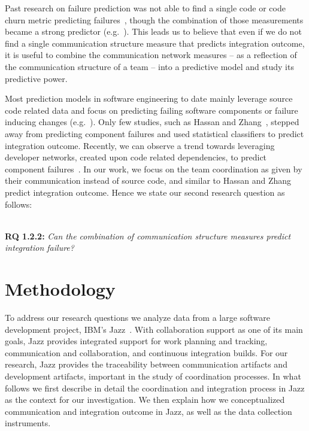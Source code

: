 Past research on failure prediction was not able to find a single code or code
churn metric predicting
failures~\cite{nagappan:icse:2006,basili:1996tse,denaro:2002seke}, though the
combination of those measurements became a strong predictor
(e.g.~\cite{mockus:2000bell}). This leads us to believe that even if we do not
find a single communication structure measure that predicts integration outcome,
it is useful to combine the communication network measures -- as a reflection of
the communication structure of a team -- into a predictive model and study its
predictive power.

Most prediction models in software engineering to date mainly leverage source
code related data and focus on predicting failing software components or failure
inducing changes
(e.g.~\cite{bell:2005tse,schroeter:isese:2006,zimmermann:icse:2008,kim:2008tse}).
Only few studies, such as Hassan and Zhang~\cite{hassan:ase:2006}, stepped away
from predicting component failures and used statistical classifiers to predict
integration outcome. Recently, we can observe a trend towards leveraging
developer networks, created upon code related dependencies, to predict component
failures~\cite{pinzger:fse:2008,meneely:fse:2008}. In our work, we focus on the
team coordination as given by their communication instead of source code, and
similar to Hassan and Zhang predict integration outcome. Hence we state our
second research question as follows:

\ \\

\noindent\textbf{RQ 1.2.2:} \emph{Can the combination of communication structure
measures predict integration failure?}



\section{Methodology}
\label{sec:Methodology}

To address our research questions we analyze data from a large software
development project, IBM's Jazz~\cite{frost:ieeesoftware:2007}. With collaboration support
as one of its main goals, Jazz provides integrated support for work planning and
tracking, communication and collaboration, and continuous integration builds. For
our research, Jazz provides the traceability between communication artifacts and
development artifacts, important in the study of coordination processes. In what
follows we first describe in detail the coordination and integration process in
Jazz as the context for our investigation. We then explain how we conceptualized
communication and integration outcome in Jazz, as well as the data collection
instruments.


